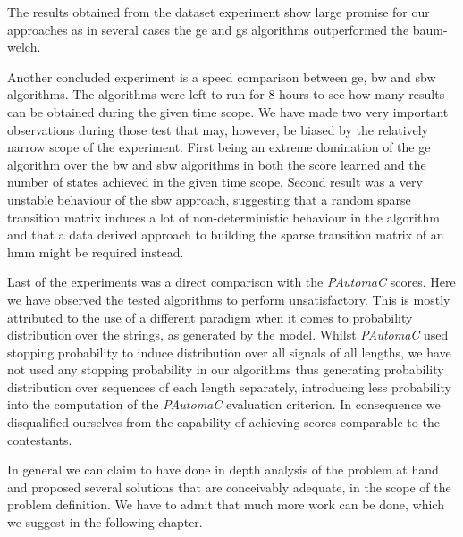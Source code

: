 The results obtained from the dataset experiment show large promise for our approaches as in several cases the \gls{ge} and \gls{gs} algorithms outperformed the \gls{baum-welch}.

Another concluded experiment is a speed comparison between \acrlong{ge}, \acrlong{bw} and \acrlong{sbw} algorithms. The algorithms were left to run for 8 hours to see how many results can be obtained during the given time scope. We have made two very important observations during those test that may, however, be biased by the relatively narrow scope of the experiment. First being an extreme domination of the \gls{ge} algorithm over the \gls{bw} and \gls{sbw} algorithms in both the score learned and the number of states achieved in the given time scope. Second result was a very unstable behaviour of the \gls{sbw} approach, suggesting that a random sparse transition matrix induces a lot of non-deterministic behaviour in the algorithm and that a data derived approach to building the sparse transition matrix of an \gls{hmm} might be required instead.

Last of the experiments was a direct comparison with the \emph{PAutomaC} scores. Here we have observed the tested algorithms to perform unsatisfactory. This is mostly attributed to the use of a different paradigm when it comes to probability distribution over the strings, as generated by the model. Whilst \emph{PAutomaC} used stopping probability to induce distribution over all signals of all lengths, we have not used any stopping probability in our algorithms thus generating probability distribution over sequences of each length separately, introducing less probability into the computation of the \emph{PAutomaC} evaluation criterion. In consequence we disqualified ourselves from the capability of achieving scores comparable to the contestants.

In general we can claim to have done in depth analysis of the problem at hand and proposed several solutions that are conceivably adequate, in the scope of the problem definition. We have to admit that much more work can be done, which we suggest in the following chapter.
